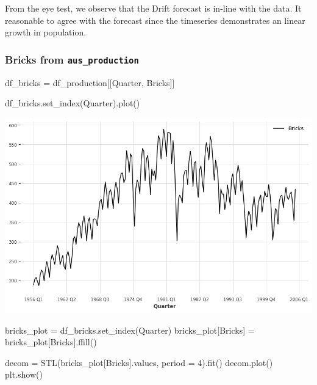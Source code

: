 \documentclass[
  11pt,
]{article}
\newenvironment{Shaded}{\begin{snugshade}}{\end{snugshade}}
\newcommand{\DecValTok}[1]{\textcolor[rgb]{0.68,0.00,0.00}{#1}}
\newcommand{\NormalTok}[1]{\textcolor[rgb]{0.00,0.23,0.31}{#1}}
\newcommand{\OperatorTok}[1]{\textcolor[rgb]{0.37,0.37,0.37}{#1}}
\newcommand{\StringTok}[1]{\textcolor[rgb]{0.13,0.47,0.30}{#1}}
\begin{document}
From the eye test, we observe that the Drift forecast is in-line with
the data. It reasonable to agree with the forecast since the timeseries
demonstrates an linear growth in population.

\subsubsection{\texorpdfstring{Bricks from
\texttt{aus\_production}}{Bricks from aus\_production}}\label{bricks-from-aus_production}

\begin{Shaded}
\begin{Highlighting}[]
\NormalTok{df\_bricks }\OperatorTok{=}\NormalTok{ df\_production[[}\StringTok{\textquotesingle{}Quarter\textquotesingle{}}\NormalTok{, }\StringTok{\textquotesingle{}Bricks\textquotesingle{}}\NormalTok{]]}
\end{Highlighting}
\end{Shaded}

\begin{Shaded}
\begin{Highlighting}[]
\NormalTok{df\_bricks.set\_index(}\StringTok{\textquotesingle{}Quarter\textquotesingle{}}\NormalTok{).plot()}
\end{Highlighting}
\end{Shaded}

\includegraphics{hw3_files/figure-pdf/cell-11-output-1.png}

\begin{Shaded}
\begin{Highlighting}[]
\NormalTok{bricks\_plot }\OperatorTok{=}\NormalTok{ df\_bricks.set\_index(}\StringTok{\textquotesingle{}Quarter\textquotesingle{}}\NormalTok{)}
\NormalTok{bricks\_plot[}\StringTok{\textquotesingle{}Bricks\textquotesingle{}}\NormalTok{] }\OperatorTok{=}\NormalTok{ bricks\_plot[}\StringTok{\textquotesingle{}Bricks\textquotesingle{}}\NormalTok{].ffill()}

\NormalTok{decom }\OperatorTok{=}\NormalTok{ STL(bricks\_plot[}\StringTok{\textquotesingle{}Bricks\textquotesingle{}}\NormalTok{].values, period }\OperatorTok{=} \DecValTok{4}\NormalTok{).fit()}
\NormalTok{decom.plot()}
\NormalTok{plt.show()}
\end{Highlighting}
\end{Shaded}
\end{document}
